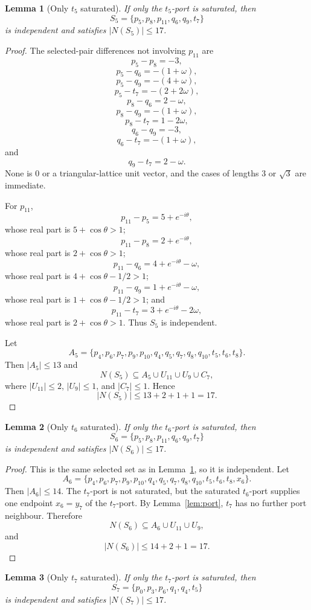 \documentclass[11pt]{article}
\theoremstyle{plain}
\newtheorem{lemma}{Lemma}
\numberwithin{equation}{section}
\begin{document}
\begin{lemma}[Only $t_5$ saturated]\label{lem:row5}
If only the $t_5$-port is saturated, then
\[
 S_5=\{p_5,p_8,p_{11},q_6,q_9,t_7\}
\]
is independent and satisfies $|N(S_5)|\le17$.
\end{lemma}

\begin{proof}
The selected-pair differences not involving $p_{11}$ are
\[
 p_5-p_8=-3,
\]
\[
 p_5-q_6=-(1+\omega),
\]
\[
 p_5-q_9=-(4+\omega),
\]
\[
 p_5-t_7=-(2+2\omega),
\]
\[
 p_8-q_6=2-\omega,
\]
\[
 p_8-q_9=-(1+\omega),
\]
\[
 p_8-t_7=1-2\omega,
\]
\[
 q_6-q_9=-3,
\]
\[
 q_6-t_7=-(1+\omega),
\]
and
\[
 q_9-t_7=2-\omega.
\]
None is $0$ or a triangular-lattice unit vector, and the cases of lengths $3$ or $\sqrt3$ are immediate.

For $p_{11}$,
\[
 p_{11}-p_5=5+e^{-i\theta},
\]
whose real part is $5+\cos\theta>1$;
\[
 p_{11}-p_8=2+e^{-i\theta},
\]
whose real part is $2+\cos\theta>1$;
\[
 p_{11}-q_6=4+e^{-i\theta}-\omega,
\]
whose real part is $4+\cos\theta-1/2>1$;
\[
 p_{11}-q_9=1+e^{-i\theta}-\omega,
\]
whose real part is $1+\cos\theta-1/2>1$; and
\[
 p_{11}-t_7=3+e^{-i\theta}-2\omega,
\]
whose real part is $2+\cos\theta>1$. Thus $S_5$ is independent.

Let
\[
 A_5=\{p_4,p_6,p_7,p_9,p_{10},q_4,q_5,q_7,q_8,q_{10},t_5,t_6,t_8\}.
\]
Then $|A_5|\le13$ and
\[
 N(S_5)\subseteq A_5\cup U_{11}\cup U_9\cup C_7,
\]
where $|U_{11}|\le2$, $|U_9|\le1$, and $|C_7|\le1$. Hence
\[
 |N(S_5)|\le13+2+1+1=17.
\]
\end{proof}

\begin{lemma}[Only $t_6$ saturated]\label{lem:row6}
If only the $t_6$-port is saturated, then
\[
 S_6=\{p_5,p_8,p_{11},q_6,q_9,t_7\}
\]
is independent and satisfies $|N(S_6)|\le17$.
\end{lemma}

\begin{proof}
This is the same selected set as in Lemma~\ref{lem:row5}, so it is independent. Let
\[
A_6=\{p_4,p_6,p_7,p_9,p_{10},q_4,q_5,q_7,q_8,q_{10},t_5,t_6,t_8,x_6\}.
\]
Then $|A_6|\le14$. The $t_7$-port is not saturated, but the saturated $t_6$-port supplies one endpoint $x_6=y_7$ of the $t_7$-port. By Lemma~\ref{lem:port}, $t_7$ has no further port neighbour. Therefore
\[
 N(S_6)\subseteq A_6\cup U_{11}\cup U_9,
\]
and
\[
 |N(S_6)|\le14+2+1=17.
\]
\end{proof}

\begin{lemma}[Only $t_7$ saturated]\label{lem:row7}
If only the $t_7$-port is saturated, then
\[
 S_7=\{p_0,p_3,p_6,q_1,q_4,t_5\}
\]
is independent and satisfies $|N(S_7)|\le17$.
\end{lemma}
\end{document}
